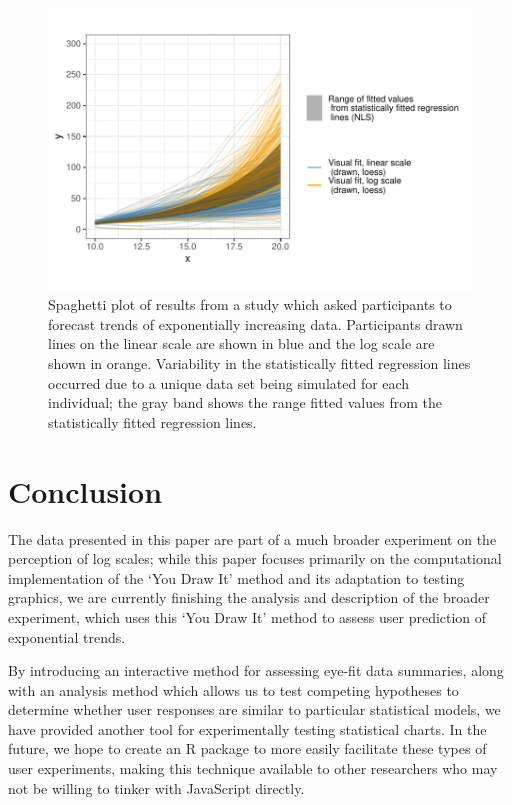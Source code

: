 \documentclass[
]{jds}
\begin{document}
\begin{figure}

{\centering \includegraphics{./images/fig-exponential-spaghetti-plot-1.pdf}

}

\caption{\label{fig-exponential-spaghetti-plot}Spaghetti plot of results
from a study which asked participants to forecast trends of
exponentially increasing data. Participants drawn lines on the linear
scale are shown in blue and the log scale are shown in orange.
Variability in the statistically fitted regression lines occurred due to
a unique data set being simulated for each individual; the gray band
shows the range fitted values from the statistically fitted regression
lines.}

\end{figure}

\hypertarget{conclusion}{%
\section{Conclusion}\label{conclusion}}

The data presented in this paper are part of a much broader experiment
on the perception of log scales; while this paper focuses primarily on
the computational implementation of the `You Draw It' method and its
adaptation to testing graphics, we are currently finishing the analysis
and description of the broader experiment, which uses this `You Draw It'
method to assess user prediction of exponential trends.

By introducing an interactive method for assessing eye-fit data
summaries, along with an analysis method which allows us to test
competing hypotheses to determine whether user responses are similar to
particular statistical models, we have provided another tool for
experimentally testing statistical charts. In the future, we hope to
create an R package to more easily facilitate these types of user
experiments, making this technique available to other researchers who
may not be willing to tinker with JavaScript directly.
\end{document}
